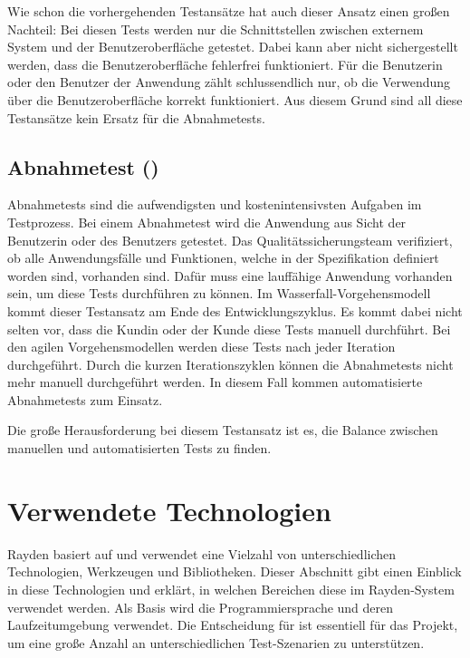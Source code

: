 \SuperPar
Wie schon die vorhergehenden Testansätze hat auch dieser Ansatz einen großen Nachteil: Bei diesen Tests werden nur die Schnittstellen zwischen externem System und der Benutzeroberfläche getestet. Dabei kann aber nicht sichergestellt werden, dass die Benutzeroberfläche fehlerfrei funktioniert. Für die Benutzerin oder den Benutzer der Anwendung zählt schlussendlich nur, ob die Verwendung über die Benutzeroberfläche korrekt funktioniert. Aus diesem Grund sind all diese Testansätze kein Ersatz für die Abnahmetests.

\subsection{Abnahmetest ()}

Abnahmetests sind die aufwendigsten und kostenintensivsten Aufgaben im Testprozess. Bei einem Abnahmetest wird die Anwendung aus Sicht der Benutzerin oder des Benutzers getestet. Das Qualitätssicherungsteam verifiziert, ob alle Anwendungsfälle und Funktionen, welche in der Spezifikation definiert worden sind, vorhanden sind. Dafür muss eine lauffähige Anwendung vorhanden sein, um diese Tests durchführen zu können. Im Wasserfall-Vorgehensmodell kommt dieser Testansatz am Ende des Entwicklungszyklus. Es kommt dabei nicht selten vor, dass die Kundin oder der Kunde diese Tests manuell durchführt. Bei den agilen Vorgehensmodellen werden diese Tests nach jeder Iteration durchgeführt. Durch die kurzen Iterationszyklen können die Abnahmetests nicht mehr manuell durchgeführt werden. In diesem Fall kommen automatisierte Abnahmetests zum Einsatz. 

\SuperPar
Die große Herausforderung bei diesem Testansatz ist es, die Balance zwischen manuellen und automatisierten Tests zu finden.

\section{Verwendete Technologien}

Rayden basiert auf und verwendet eine Vielzahl von unterschiedlichen Technologien, Werkzeugen und Bibliotheken. Dieser Abschnitt gibt einen Einblick in diese Technologien und erklärt, in welchen Bereichen diese im Rayden-System verwendet werden. Als Basis wird die Programmiersprache  und deren Laufzeitumgebung verwendet. Die Entscheidung für  ist essentiell für das Projekt, um eine große Anzahl an unterschiedlichen Test-Szenarien zu unterstützen. 

